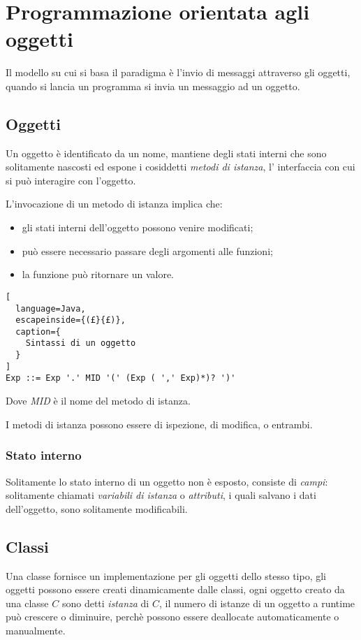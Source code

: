 \chapter{Programmazione orientata agli oggetti}
Il modello su cui si basa il paradigma è l'invio di messaggi attraverso gli
oggetti, quando si lancia un programma si invia un messaggio ad un oggetto.

\section{Oggetti}
Un oggetto è identificato da un nome, mantiene degli stati interni che sono
solitamente nascosti ed espone i cosiddetti \emph{metodi di istanza}, l'
interfaccia con cui si può interagire con l'oggetto.

L'invocazione di un metodo di istanza implica che:
\begin{itemize}
  \item gli stati interni dell'oggetto possono venire modificati;
  \item può essere necessario passare degli argomenti alle funzioni;
  \item la funzione può ritornare un valore.
\end{itemize}

\begin{lstlisting}[
  language=Java,
  escapeinside={(£}{£)},
  caption={
    Sintassi di un oggetto
  }
]
Exp ::= Exp '.' MID '(' (Exp ( ',' Exp)*)? ')'
\end{lstlisting}

Dove \emph{MID} è il nome del metodo di istanza.

I metodi di istanza possono essere di ispezione, di modifica, o entrambi.

\subsection{Stato interno}
Solitamente lo stato interno di un oggetto non è esposto, consiste di \emph{
campi}: solitamente chiamati \emph{variabili di istanza} o \emph{attributi},
i quali salvano i dati dell'oggetto, sono solitamente modificabili.

\section{Classi}
Una classe fornisce un implementazione per gli oggetti dello stesso tipo, gli
oggetti possono essere creati dinamicamente dalle classi, ogni oggetto creato
da una classe $C$ sono detti \emph{istanza} di $C$, il numero di istanze di un
oggetto a runtime può crescere o diminuire, perchè possono essere deallocate
automaticamente o manualmente.

